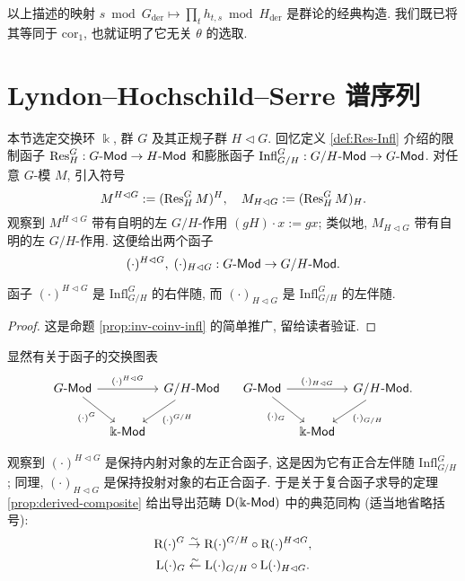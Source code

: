 以上描述的映射 $s \bmod G_{\mathrm{der}} \mapsto \prod_t h_{t, s} \bmod H_{\mathrm{der}}$ 是群论的经典构造. 我们既已将其等同于 $\mathrm{cor}_1$, 也就证明了它无关 $\theta$ 的选取.

\section{Lyndon--Hochschild--Serre 谱序列}\label{sec:LHS-SS}
本节选定交换环 $\Bbbk$, 群 $G$ 及其正规子群 $H \lhd G$. 回忆定义 \ref{def:Res-Infl} 介绍的限制函子 $\operatorname{Res}^G_H:  G\text{-}\mathsf{Mod} \to H\text{-}\mathsf{Mod}$ 和膨胀函子 $\mathrm{Infl}^G_{G/H}:  G/H\text{-}\mathsf{Mod} \to G\text{-}\mathsf{Mod}$. 对任意 $G$-模 $M$, 引入符号
\[ M^{H \lhd G} := (\operatorname{Res}^G_H M)^H, \quad M_{H \lhd G} := (\operatorname{Res}^G_H M)_H. \]
观察到 $M^{H \lhd G}$ 带有自明的左 $G/H$-作用 $(gH) \cdot x := gx$; 类似地, $M_{H \lhd G}$ 带有自明的左 $G/H$-作用. 这便给出两个函子
\[ (\cdot)^{H \lhd G}, \; (\cdot)_{H \lhd G}: G\text{-}\mathsf{Mod} \to G/H\text{-}\mathsf{Mod}. \]

\begin{lemma}
	函子 $(\cdot)^{H \lhd G}$ 是 $\mathrm{Infl}^G_{G/H}$ 的右伴随, 而 $(\cdot)_{H \lhd G}$ 是 $\mathrm{Infl}^G_{G/H}$ 的左伴随.
\end{lemma}
\begin{proof}
	这是命题 \ref{prop:inv-coinv-infl} 的简单推广, 留给读者验证.
\end{proof}

显然有关于函子的交换图表
\[\begin{tikzcd}[column sep=tiny]
	G\dcate{Mod} \arrow[rr, "{(\cdot)^{H \lhd G}}"] \arrow[rd, "{(\cdot)^G}"'] & & G/H\dcate{Mod} \arrow[ld, "{(\cdot)^{G/H}}"] \\
	& \Bbbk\dcate{Mod} &
\end{tikzcd} \quad \begin{tikzcd}[column sep=tiny]
	G\dcate{Mod} \arrow[rr, "{(\cdot)_{H \lhd G}}"] \arrow[rd, "{(\cdot)_G}"'] & & G/H\dcate{Mod}. \arrow[ld, "{(\cdot)_{G/H}}"] \\
	& \Bbbk\dcate{Mod} &
\end{tikzcd}\]

观察到 $(\cdot)^{H \lhd G}$ 是保持内射对象的左正合函子, 这是因为它有正合左伴随 $\mathrm{Infl}^G_{G/H}$; 同理, $(\cdot)_{H \lhd G}$ 是保持投射对象的右正合函子. 于是关于复合函子求导的定理 \ref{prop:derived-composite} 给出导出范畴 $\mathsf{D}(\Bbbk\text{-}\mathsf{Mod})$ 中的典范同构 (适当地省略括号):
\begin{equation}\label{eqn:LHS-derived}
	\begin{gathered}
		\mathrm{R}(\cdot)^G \stackrel{\sim}{\rightarrow} \mathrm{R}(\cdot)^{G/H} \circ \mathrm{R}(\cdot)^{H \lhd G}, \\
		\mathrm{L}(\cdot)_G \stackrel{\sim}{\leftarrow} \mathrm{L}(\cdot)_{G/H} \circ \mathrm{L}(\cdot)_{H \lhd G}.
	\end{gathered}
\end{equation}

